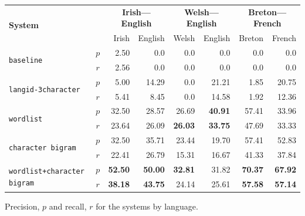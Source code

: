 \documentclass[a0paper,fontscale=0.3]{baposter}  %
\begin{document}
\begin{poster}
{			\begin{center}
			\begin{tabular}{|lc|r|r|r|r|r|r|}
			\hline
			\multirow{2}{*}{\textbf{System}}            & & \multicolumn{2}{c}{\textbf{Irish---English}} & \multicolumn{2}{|c|}{\textbf{Welsh---English}} & \multicolumn{2}{c|}{\textbf{Breton---French}}  \\\cline{3-8}
			                                          &      &  Irish &  English & Welsh  & English & Breton & French \\
			\hline
			\multirow{2}{*}{\texttt{baseline}}        &  $p$ &  2.50   & 0.0      & 0.0   & 0.0 & 0.0 & 0.0 \\
			                                          & $r$  & 2.56    & 0.0      & 0.0   & 0.0 & 0.0 & 0.0 \\
			\hline
			\multirow{2}{*}{\texttt{langid-3character}}         &  $p$ &  5.00   & 14.29    & 0.0   & 21.21 & 1.85 & 20.75 \\
			                                          & $r$  & 5.41    & 8.45     & 0.0   & 14.58 & 1.92 & 12.36 \\
			\hline
			\multirow{2}{*}{\texttt{wordlist}}        &  $p$ &  32.50 & 28.57     & 26.69 & {\bf 40.91} & 57.41 & 33.96 \\
			                                          & $r$  & 23.64  & 26.09     & {\bf 26.03} & {\bf 33.75} & 47.69 & 33.33 \\
			\hline
			\multirow{2}{*}{\texttt{character bigram}}          &  $p$ &  32.50   & 35.71   & 23.44 & 19.70  & 57.41 & 52.83 \\
			                                          & $r$  & 22.41    & 26.79   & 15.31 & 16.67 & 41.33 & 37.84 \\
			\hline
			\multirow{2}{*}{\texttt{wordlist+character bigram}} &  $p$ &  {\bf 52.50}   & {\bf 50.00}   & {\bf 32.81} & 31.82 & {\bf 70.37} & {\bf 67.92} \\
			                                          & $r$  & {\bf 38.18}    & {\bf 43.75}   & 24.14 & 25.61 & {\bf 57.58} & {\bf 57.14} \\
			\hline
			\end{tabular}
			\end{center}
			\vspace{-0.4cm}
		\caption{Precision, $p$ and recall, $r$ for the systems by language.}
			\label{table:precisionrecall}
			
			\vspace{0.5cm}

}
\end{poster}
\end{document}
